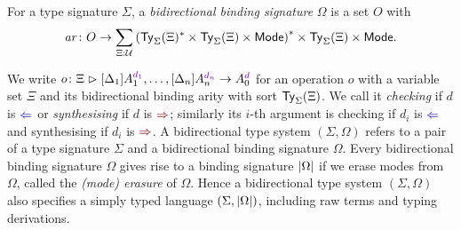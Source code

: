 \begin{definition}
  For a type signature $\Sigma$, a \emph{bidirectional binding signature} $\Omega$ is a set $O$ with
  \[
    \mathit{ar}\colon O \to \sum_{\Xi : \mathcal{U}} \left(\mathsf{Ty}_{\Sigma}(\Xi)^* \times \mathsf{Ty}_{\Sigma}(\Xi) \times {\mathsf{Mode}}\right)^* \times \mathsf{Ty}_{\Sigma}(\Xi) \times {\mathsf{Mode}}.
  \]
\end{definition}
We write $\biop$ for an operation $o$ with a variable set $\Xi$ and its bidirectional binding arity with sort $\mathsf{Ty}_{\Sigma}(\Xi)$.
We call it \emph{checking} if $d$ is ${\chk}$ or \emph{synthesising} if $d$ is ${\syn}$; similarly its $i$-th argument is checking if $d_i$ is $\chk$ and synthesising if $d_i$ is $\syn$.
A bidirectional type system $(\Sigma, \Omega)$ refers to a pair of a type signature $\Sigma$ and a bidirectional binding signature $\Omega$.
Every bidirectional binding signature $\Omega$ gives rise to a binding signature $\left|\Omega\right|$ if we erase modes from $\Omega$, called the \emph{(mode) erasure} of $\Omega$.
Hence a bidirectional type system $(\Sigma, \Omega)$ also specifies a simply typed language $(\Sigma, \left|\Omega\right|)$, including raw terms and typing derivations.

